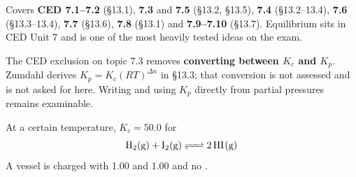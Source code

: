 \documentclass{apchem-exam}
\begin{document}
\apctitleblock

\begin{apcnote}
Covers \textbf{CED 7.1--7.2} (\S13.1), \textbf{7.3} and \textbf{7.5}
(\S13.2, \S13.5), \textbf{7.4} (\S13.2--13.4), \textbf{7.6}
(\S13.3--13.4), \textbf{7.7} (\S13.6), \textbf{7.8} (\S13.1) and
\textbf{7.9--7.10} (\S13.7). Equilibrium sits in CED Unit 7 and is one of
the most heavily tested ideas on the exam.

The CED exclusion on topic 7.3 removes \textbf{converting between $K_c$
and $K_p$}. Zumdahl derives $K_p = K_c(RT)^{\Delta n}$ in \S13.3; that
conversion is not assessed and is not asked for here. Writing and using
$K_p$ directly from partial pressures remains examinable.
\end{apcnote}



At a certain temperature, $K_c = 50.0$ for
\[ \ce{H2(g) + I2(g) <=> 2HI(g)} \]
A vessel is charged with \SI{1.00}{\Molar}  and
\SI{1.00}{\Molar}  and no .
\end{document}
